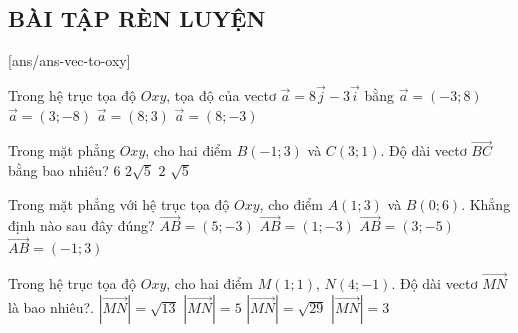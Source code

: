 \subsection{BÀI TẬP RÈN LUYỆN}
 
\setcounter{ex}{0}
[ans/ans-vec-to-oxy]
\begin{ex}%
	Trong hệ trục tọa độ $Oxy$, tọa độ của vectơ $\overrightarrow{a} = 8\overrightarrow{j} - 3\overrightarrow{i}$ bằng
	\choice
	{\True $\overrightarrow{a} = \left(-3; 8\right)$}
	{$\overrightarrow{a} = \left(3; -8\right)$}
	{$\overrightarrow{a} = \left(8; 3\right)$}
	{$\overrightarrow{a} = \left(8; -3\right)$}
\end{ex}
\begin{ex}%
	Trong mặt phẳng $Oxy$, cho hai điểm $B\left(-1; 3\right)$ và $C\left(3; 1\right)$. Độ dài vectơ $\overrightarrow{BC}$ bằng bao nhiêu?
	\choice
	{$6$}
	{\True $2\sqrt{5}$}
	{$2$}
	{$\sqrt{5}$}
\end{ex}
\begin{ex}%
	Trong mặt phẳng với hệ trục tọa độ $Oxy$, cho điểm $A\left(1; 3\right)$ và $B\left(0; 6\right)$. Khẳng định nào sau đây đúng?
	\choice
	{$\overrightarrow{AB} = \left(5; -3\right)$}
	{$\overrightarrow{AB} = \left(1; -3\right)$}
	{$\overrightarrow{AB} = \left(3; -5\right)$}
	{\True $\overrightarrow{AB} = \left(-1; 3\right)$}
\end{ex}
\begin{ex}%
	Trong hệ trục tọa độ $Oxy$, cho hai điểm $M\left(1; 1\right)$, $N\left(4; -1\right)$. Độ dài vectơ $\overrightarrow{MN}$ là bao nhiêu?.
	\choice
	{\True $\left|\overrightarrow{MN}\right| = \sqrt{13}$}
	{$\left|\overrightarrow{MN}\right| = 5$}
	{$\left|\overrightarrow{MN}\right| = \sqrt{29}$}
	{$\left|\overrightarrow{MN}\right| = 3$}
\end{ex}
